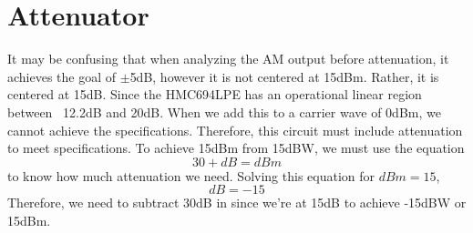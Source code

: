 \section{Attenuator}
It may be confusing that when analyzing the AM output before attenuation, it achieves the goal of $\pm$5dB, however it is not centered at 15dBm. Rather, it is centered at 15dB. Since the HMC694LPE has an operational linear region between ~12.2dB and 20dB. When we add this to a carrier wave of 0dBm, we cannot achieve the specifications. Therefore, this circuit must include attenuation to meet specifications. To achieve 15dBm from 15dBW, we must use the equation
\begin{equation}
    30 + dB = dBm
\end{equation}
to know how much attenuation we need. Solving this equation for $dBm=15$,
\begin{equation}
    dB = -15
\end{equation}
Therefore, we need to subtract 30dB in since we're at 15dB to achieve -15dBW or 15dBm.
